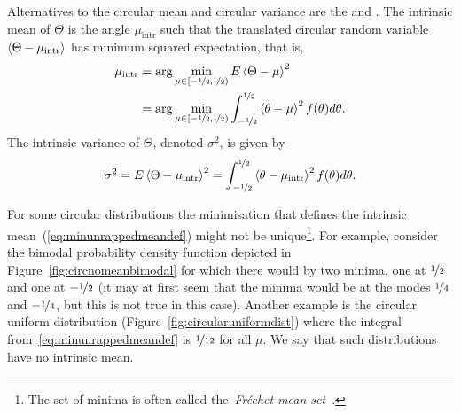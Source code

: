 \documentclass[journal]{../bib/IEEEtran}
\begin{document}
Alternatives to the circular mean and circular variance are the  and .  
The intrinsic mean of $\Theta$ is the angle $\mu_{\text{intr}}$ such that the translated circular random variable $\left< \Theta - \mu_{\text{intr}} \right>$ has minimum squared expectation, that is,
\begin{align}
\mu_{\text{intr}}  &= \arg \min_{\mu \in [-\nicefrac{1}{2}, \nicefrac{1}{2})}E\fracpart{\Theta - \mu}^2 \nonumber \\
&= \arg \min_{\mu \in [-\nicefrac{1}{2}, \nicefrac{1}{2})}\int_{-\nicefrac{1}{2}}^{\nicefrac{1}{2}}\fracpart{\theta - \mu}^2f(\theta) d\theta. \label{eq:minunrappedmeandef}
\end{align}
The intrinsic variance of $\Theta$, denoted $\sigma^2$, is given by 
\[
\sigma^2 = E\left< \Theta - \mu_{\text{intr}} \right>^2 = \int_{-\nicefrac{1}{2}}^{\nicefrac{1}{2}}\left< \theta - \mu_{\text{intr}} \right>^2f(\theta) d\theta.
\]

For some circular distributions the minimisation that defines the intrinsic mean~(\ref{eq:minunrappedmeandef}) might not be unique\footnote{The set of minima is often called the~\emph{Fr\'{e}chet mean set}~\cite{Bhattacharya_int_ext_means_2003,Bhattacharya_int_ext_means_2005}.}.  For example, consider the bimodal probability density function depicted in Figure~\ref{fig:circnomeanbimodal} for which there would by two minima, one at $\nicefrac{1}{2}$ and one at $-\nicefrac{1}{2}$ (it may at first seem that the minima would be at the modes $\nicefrac{1}{4}$ and $-\nicefrac{1}{4}$, but this is not true in this case).  Another example is the circular uniform distribution (Figure~\ref{fig:circularuniformdist}) where the integral from~\eqref{eq:minunrappedmeandef} is $\nicefrac{1}{12}$ for all $\mu$.  We say that such distributions have no intrinsic mean.
\end{document}
